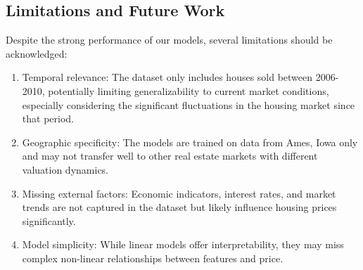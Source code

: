 \documentclass{article}
\begin{document}

\subsection{Limitations and Future Work}

Despite the strong performance of our models, several limitations should be acknowledged:
\begin{enumerate}
    \item Temporal relevance: The dataset only includes houses sold between 2006-2010, potentially limiting generalizability to current market conditions, especially considering the significant fluctuations in the housing market since that period.
    \item Geographic specificity: The models are trained on data from Ames, Iowa only and may not transfer well to other real estate markets with different valuation dynamics.
    \item Missing external factors: Economic indicators, interest rates, and market trends are not captured in the dataset but likely influence housing prices significantly.
    \item Model simplicity: While linear models offer interpretability, they may miss complex non-linear relationships between features and price.
\end{enumerate}
\end{document}
